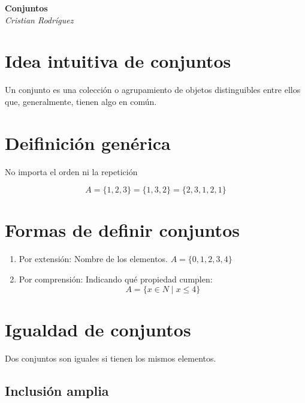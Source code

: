 \documentclass{article}
\begin{document}
    \begin{titlepage}
        \begin{center}
            \Large\textbf{Conjuntos}\\
            \large\textit{Cristian Rodríguez}
        \end{center}
    \end{titlepage}

    \section{Idea intuitiva de conjuntos}

    Un conjunto es una colección o agrupamiento de objetos distinguibles
    entre ellos que, generalmente, tienen algo en común.


    \section{Deifinición genérica}

    No importa el orden ni la repetición

    \[
        A = \{ 1, 2, 3 \} = \{ 1, 3, 2 \} = \{ 2, 3, 1, 2, 1 \}
    \]


    \section{Formas de definir conjuntos}

    \begin{enumerate}
        \item Por extensión: Nombre de los elementos. $A = \{ 0, 1, 2, 3, 4 \}$
        \item Por comprensión: Indicando qué propiedad cumplen:
        \[A = \{ x \in N \mid x \le 4\}\]
    \end{enumerate}


    \section{Igualdad de conjuntos}

    Dos conjuntos son iguales si tienen los mismos elementos.

    \subsection{Inclusión amplia}
\end{document}
